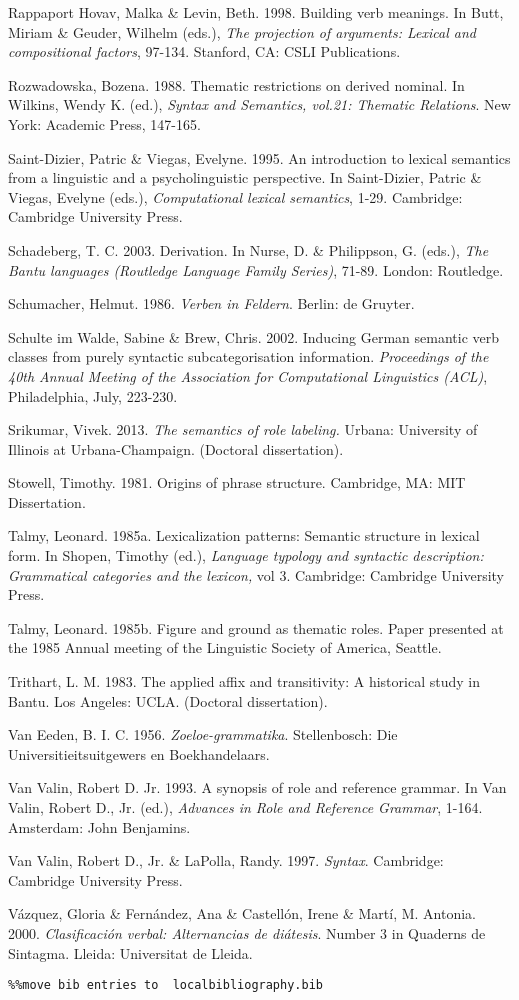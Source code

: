 Rappaport Hovav, Malka \& Levin, Beth. 1998. Building verb meanings. In Butt, Miriam \& Geuder, Wilhelm (eds.), \textit{The projection of arguments: Lexical and compositional factors}, 97-134. Stanford, CA: CSLI Publications.

Rozwadowska, Bozena. 1988. Thematic restrictions on derived nominal. In Wilkins, Wendy K. (ed.), \textit{Syntax and Semantics, vol.21: Thematic Relations}. New York: Academic Press, 147-165.

Saint-Dizier, Patric \& Viegas, Evelyne. 1995. An introduction to lexical semantics from a linguistic and a psycholinguistic perspective. In Saint-Dizier, Patric \& Viegas, Evelyne (eds.), \textit{Computational lexical semantics}, 1-29. Cambridge: Cambridge   University Press.

Schadeberg, T. C. 2003. Derivation. In Nurse, D. \& Philippson, G. (eds.), \textit{The Bantu languages (Routledge Language Family Series)}, 71-89. London: Routledge.

Schumacher, Helmut. 1986. \textit{Verben in Feldern}. Berlin: de Gruyter.

Schulte im Walde, Sabine \& Brew, Chris. 2002. Inducing German semantic verb classes from purely syntactic subcategorisation information. \textit{Proceedings of the 40th Annual Meeting of the Association for Computational Linguistics (ACL)}, Philadelphia, July, 223-230.

Srikumar, Vivek. 2013. \textit{The semantics of role labeling.} Urbana: University of Illinois at Urbana-Champaign. (Doctoral dissertation).

Stowell, Timothy. 1981. Origins of phrase structure. Cambridge, MA: MIT Dissertation.

Talmy, Leonard. 1985a. Lexicalization patterns: Semantic structure in lexical form. In Shopen, Timothy (ed.), \textit{Language typology and syntactic description: Grammatical categories and the lexicon, }vol 3. Cambridge: Cambridge University Press.

Talmy, Leonard. 1985b. Figure and ground as thematic roles. Paper presented at the 1985 Annual meeting of the Linguistic Society of America, Seattle.

Trithart, L. M. 1983. The applied affix and transitivity: A historical study in Bantu. Los Angeles: UCLA. (Doctoral dissertation).

Van Eeden, B. I. C. 1956. \textit{Zoeloe-grammatika}. Stellenbosch: Die Universitieitsuitgewers en Boekhandelaars.

Van Valin, Robert D. Jr. 1993. A synopsis of role and reference grammar. In Van Valin, Robert D., Jr. (ed.), \textit{Advances in Role and Reference Grammar}, 1-164. Amsterdam: John Benjamins.

Van Valin, Robert D., Jr. \& LaPolla, Randy. 1997. \textit{Syntax}. Cambridge: Cambridge University Press.

Vázquez, Gloria \& Fernández, Ana \& Castellón, Irene \& Martí, M. Antonia. 2000. \textit{Clasificación verbal: Alternancias de diátesis}. Number 3 in Quaderns de Sintagma. Lleida: Universitat de Lleida.


\begin{verbatim}%%move bib entries to  localbibliography.bib
\end{verbatim}